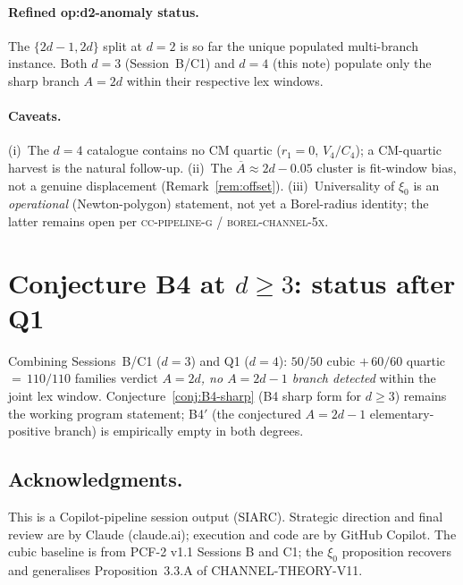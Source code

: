 \documentclass[11pt]{amsart}
\begin{document}
\paragraph{Refined op:d2-anomaly status.}
The $\{2d-1,2d\}$ split at $d=2$ is so far the unique populated
multi-branch instance. Both $d=3$ (Session~B/C1) and $d=4$ (this note)
populate only the sharp branch $A=2d$ within their respective lex
windows.

\paragraph{Caveats.}
(i)~The $d=4$ catalogue contains no CM quartic ($r_1=0$, $V_4/C_4$);
a CM-quartic harvest is the natural follow-up.  (ii)~The
$\overline{A}\approx 2d-0.05$ cluster is fit-window bias, not a
genuine displacement (Remark~\ref{rem:offset}).  (iii)~Universality
of $\xi_0$ is an \emph{operational} (Newton-polygon) statement, not
yet a Borel-radius identity; the latter remains open per
\textsc{cc-pipeline-g} / \textsc{borel-channel-5x}.

\section{Conjecture B4 at $d\ge 3$: status after Q1}

Combining Sessions~B/C1 ($d=3$) and Q1 ($d=4$):
$50/50$ cubic $+\,60/60$ quartic $=\,110/110$ families verdict
\emph{$A=2d$, no $A=2d-1$ branch detected} within the joint lex
window. Conjecture~\ref{conj:B4-sharp} (B4 sharp form for $d\ge 3$)
remains the working program statement; B4$'$ (the conjectured $A=2d-1$
elementary-positive branch) is empirically empty in both degrees.

\subsection*{Acknowledgments.}
This is a Copilot-pipeline session output (SIARC). Strategic direction
and final review are by Claude (claude.ai); execution and code are by
GitHub Copilot. The cubic baseline is from PCF-2 v1.1 Sessions B and
C1; the $\xi_0$ proposition recovers and generalises Proposition~3.3.A
of CHANNEL-THEORY-V11.
\end{document}
